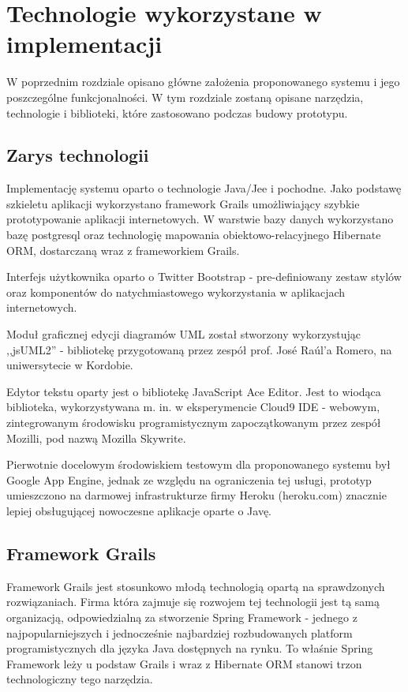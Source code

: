 \chapter{Technologie wykorzystane w implementacji}
  
  W poprzednim rozdziale opisano główne założenia proponowanego systemu i jego poszczególne funkcjonalności. W tym rozdziale zostaną opisane narzędzia, technologie i biblioteki, które zastosowano podczas budowy prototypu.

  \section{Zarys technologii}
    
    Implementację systemu oparto o technologie Java/Jee i pochodne. Jako podstawę szkieletu aplikacji wykorzystano framework Grails umożliwiający szybkie prototypowanie aplikacji internetowych. W warstwie bazy danych wykorzystano bazę postgresql oraz technologię mapowania obiektowo-relacyjnego Hibernate ORM, dostarczaną wraz z frameworkiem Grails. 
    
    Interfejs użytkownika oparto o Twitter Bootstrap - pre-definiowany zestaw stylów oraz komponentów do natychmiastowego wykorzystania w aplikacjach internetowych. 

    Moduł graficznej edycji diagramów UML został stworzony wykorzystując ,,jsUML2'' - bibliotekę przygotowaną przez zespół prof. José Raúl'a Romero, na uniwersytecie w Kordobie. 

    Edytor tekstu oparty jest o bibliotekę JavaScript Ace Editor. Jest to wiodąca biblioteka, wykorzystywana m. in. w eksperymencie Cloud9 IDE - webowym, zintegrowanym środowisku programistycznym zapoczątkowanym przez zespół Mozilli, pod nazwą Mozilla Skywrite.
  
    Pierwotnie docelowym środowiskiem testowym dla proponowanego systemu był Google App Engine, jednak ze względu na ograniczenia tej usługi, prototyp umieszczono na darmowej infrastrukturze firmy Heroku (heroku.com) znacznie lepiej obsługującej nowoczesne aplikacje oparte o Javę.

  \section{Framework Grails}
    
    Framework Grails jest stosunkowo młodą technologią opartą na sprawdzonych rozwiązaniach. Firma która zajmuje się rozwojem tej technologii jest tą samą organizacją, odpowiedzialną za stworzenie Spring Framework - jednego z najpopularniejszych i jednocześnie najbardziej rozbudowanych platform programistycznych dla języka Java dostępnych na rynku. To właśnie Spring Framework leży u podstaw Grails i wraz z Hibernate ORM stanowi trzon technologiczny tego narzędzia.


